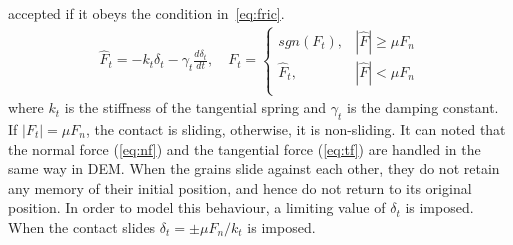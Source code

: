 accepted if it obeys the condition in~\cref{eq:fric}.
%
\begin{align}
 {\hat{F}_{t}}=-{{k}_{t}}{{\delta}_{t}}-{{\gamma}_{t}}\frac{d{{\delta}_{t}}}{dt},
  \quad F_{t}=
\begin{cases}
sgn(F_{t}), & {\left|\hat{F}\right|} \ge \mu F_{n} \\
{\hat{F}}_{t}, & {\left|\hat{F}\right|} < \mu F_{n} \\
\end{cases}
\label{eq:tf}
\end{align} 
%
where $k_{t}$ is the stiffness of the tangential spring and $\gamma_{t}$ is the 
damping constant. If $|F_{t}|=\mu F_{n}$, the contact is sliding, otherwise, it 
is non-sliding. It can noted that the normal force (\cref{eq:nf}) and the 
tangential force (\cref{eq:tf}) are handled in the same way in DEM. When the 
grains slide against each other, they do not retain any memory 
of their initial position, and hence do not return to its original position. In 
order to model this behaviour, a limiting value of $\delta_{t}$ is imposed. 
When the contact slides $\delta_{t}=\pm\mu F_{n}/k_{t}$ is imposed.

